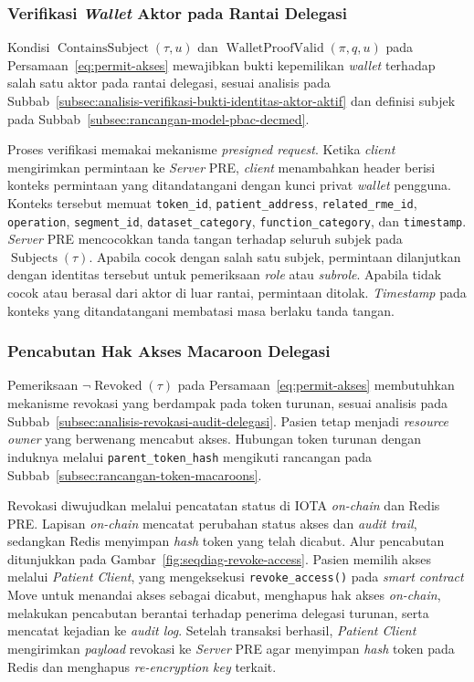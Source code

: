 \documentclass[bahasa, 12pt, a4paper, onecolumn, oneside, final]{report}
\begin{document}
\subsubsection{Verifikasi \textit{Wallet} Aktor pada Rantai Delegasi}
\label{subsubsec:verifikasi-wallet-aktor-aktif}

Kondisi $\operatorname{ContainsSubject}(\tau,u)$ dan $\operatorname{WalletProofValid}(\pi,q,u)$ pada Persamaan~\ref{eq:permit-akses} mewajibkan bukti kepemilikan \textit{wallet} terhadap salah satu aktor pada rantai delegasi, sesuai analisis pada Subbab~\ref{subsec:analisis-verifikasi-bukti-identitas-aktor-aktif} dan definisi subjek pada Subbab~\ref{subsec:rancangan-model-pbac-decmed}.

Proses verifikasi memakai mekanisme \textit{presigned request}. Ketika \textit{client} mengirimkan permintaan ke \textit{Server} PRE, \textit{client} menambahkan header berisi konteks permintaan yang ditandatangani dengan kunci privat \textit{wallet} pengguna. Konteks tersebut memuat \texttt{token\_id}, \texttt{patient\_address}, \texttt{related\_rme\_id}, \texttt{operation}, \texttt{segment\_id}, \texttt{dataset\_category}, \texttt{function\_category}, dan \texttt{timestamp}. \textit{Server} PRE mencocokkan tanda tangan terhadap seluruh subjek pada $\operatorname{Subjects}(\tau)$. Apabila cocok dengan salah satu subjek, permintaan dilanjutkan dengan identitas tersebut untuk pemeriksaan \textit{role} atau \textit{subrole}. Apabila tidak cocok atau berasal dari aktor di luar rantai, permintaan ditolak. \textit{Timestamp} pada konteks yang ditandatangani membatasi masa berlaku tanda tangan.

\subsubsection{Pencabutan Hak Akses Macaroon Delegasi}
\label{subsubsec:pencabutan-hak-akses-macaroon-delegasi}

Pemeriksaan $\neg\operatorname{Revoked}(\tau)$ pada Persamaan~\ref{eq:permit-akses} membutuhkan mekanisme revokasi yang berdampak pada token turunan, sesuai analisis pada Subbab~\ref{subsec:analisis-revokasi-audit-delegasi}. Pasien tetap menjadi \textit{resource owner} yang berwenang mencabut akses. Hubungan token turunan dengan induknya melalui \texttt{parent\_token\_hash} mengikuti rancangan pada Subbab~\ref{subsec:rancangan-token-macaroons}.

Revokasi diwujudkan melalui pencatatan status di IOTA \textit{on-chain} dan Redis PRE. Lapisan \textit{on-chain} mencatat perubahan status akses dan \textit{audit trail}, sedangkan Redis menyimpan \textit{hash} token yang telah dicabut. Alur pencabutan ditunjukkan pada Gambar~\ref{fig:seqdiag-revoke-access}. Pasien memilih akses melalui \textit{Patient Client}, yang mengeksekusi \texttt{revoke\_access()} pada \textit{smart contract} Move untuk menandai akses sebagai dicabut, menghapus hak akses \textit{on-chain}, melakukan pencabutan berantai terhadap penerima delegasi turunan, serta mencatat kejadian ke \textit{audit log}. Setelah transaksi berhasil, \textit{Patient Client} mengirimkan \textit{payload} revokasi ke \textit{Server} PRE agar menyimpan \textit{hash} token pada Redis dan menghapus \textit{re-encryption key} terkait.
\end{document}
